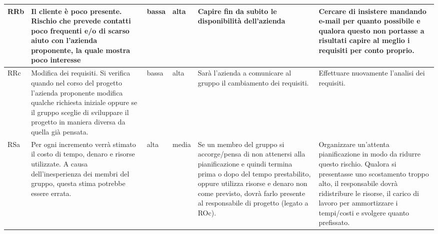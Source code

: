 {\begin{longtable}{|p{0.8cm}|p{3cm}|p{1cm}|p{1cm}|p{3cm}|p{3.2cm}|}
        \hline
        RRb &
        Il cliente è poco presente.
        Rischio che prevede
        contatti poco frequenti
        e/o di scarso
        aiuto con l’azienda
        proponente, la quale mostra
        poco interesse &
        bassa &
        alta &
        Capire fin da subito
        le disponibilità
        dell’azienda &
        Cercare di insistere mandando e-mail per quanto possibile
e qualora questo non portasse a risultati capire al meglio i requisiti per conto proprio.\\
        \hline
        RRc &
        Modifica dei requisiti.
        Si verifica quando
        nel corso del
        progetto l’azienda
        proponente modifica
        qualche richiesta
        iniziale oppure se
        il gruppo sceglie
        di sviluppare il
        progetto in maniera
        diversa da quella
        già pensata. &
        bassa &
        alta &
        Sarà l’azienda a comunicare
        al gruppo
        il cambiamento dei
        requisiti. &
        Effettuare nuovamente
        l’analisi dei
        requisiti. \\
        \hline
        RSa &
        Per ogni incremento verrà stimato il costo di tempo, denaro e risorse utilizzate. A causa dell’inesperienza dei membri del gruppo, questa stima potrebbe essere errata. &
        alta &
        media &
        Se un membro del gruppo si accorge/pensa di non attenersi alla pianificazione e quindi termina prima o dopo del tempo prestabilito, oppure utilizza risorse e denaro non come previsto, dovrà farlo presente al responsabile di progetto (legato a ROc). &
        Organizzare un’attenta pianificazione in modo da ridurre questo rischio. Qualora si presentasse uno scostamento troppo alto, il responsabile dovrà
        ridistribure le risorse, il carico di lavoro per ammortizzare i tempi/costi e svolgere quanto prefissato.  \\

        \end{longtable}
    }